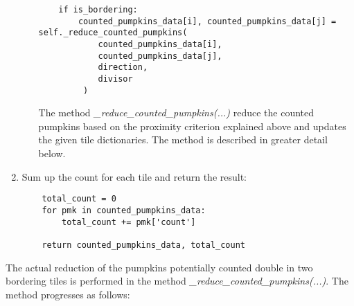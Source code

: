 \documentclass[../Head/Main.tex]{subfiles}
\begin{document}
\begin{enumerate}
\begin{enumerate}
\begin{verbatim}
    if is_bordering:
        counted_pumpkins_data[i], counted_pumpkins_data[j] = self._reduce_counted_pumpkins(
            counted_pumpkins_data[i],
            counted_pumpkins_data[j],
            direction,
            divisor
         )
\end{verbatim}
The method \textit{\_reduce\_counted\_pumpkins(...)} reduce the counted pumpkins based on the proximity criterion explained above and updates the given tile dictionaries. The method is described in greater detail below.
\end{enumerate}
\item Sum up the count for each tile and return the result:
\begin{verbatim}
    total_count = 0
    for pmk in counted_pumpkins_data:
        total_count += pmk['count']
    
    return counted_pumpkins_data, total_count
\end{verbatim}
\end{enumerate}
The actual reduction of the pumpkins potentially counted double in two bordering tiles is performed in the method \textit{\_reduce\_counted\_pumpkins(...)}. The method progresses as follows:
\end{document}
